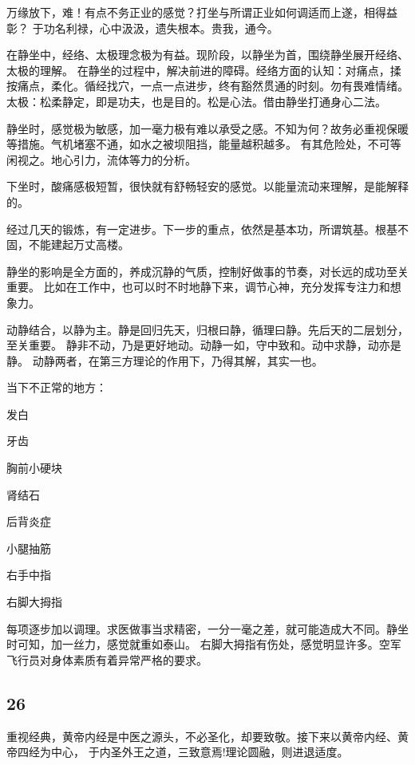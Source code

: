 万缘放下，难！有点不务正业的感觉？打坐与所谓正业如何调适而上遂，相得益彰？
于功名利禄，心中汲汲，遗失根本。贵我，通今。

在静坐中，经络、太极理念极为有益。现阶段，以静坐为首，围绕静坐展开经络、太极的理解。
在静坐的过程中，解决前进的障碍。经络方面的认知：对痛点，揉按痛点，柔化。循经找穴，一点一点进步，终有豁然贯通的时刻。勿有畏难情绪。
太极：松柔静定，即是功夫，也是目的。松是心法。借由静坐打通身心二法。

静坐时，感觉极为敏感，加一毫力极有难以承受之感。不知为何？故务必重视保暖等措施。气机堵塞不通，如水之被坝阻挡，能量越积越多。
有其危险处，不可等闲视之。地心引力，流体等力的分析。

下坐时，酸痛感极短暂，很快就有舒畅轻安的感觉。以能量流动来理解，是能解释的。

经过几天的锻炼，有一定进步。下一步的重点，依然是基本功，所谓筑基。根基不固，不能建起万丈高楼。

静坐的影响是全方面的，养成沉静的气质，控制好做事的节奏，对长远的成功至关重要。
比如在工作中，也可以时不时地静下来，调节心神，充分发挥专注力和想象力。

动静结合，以静为主。静是回归先天，归根曰静，循理曰静。先后天的二层划分，至关重要。
静非不动，乃是更好地动。动静一如，守中致和。动中求静，动亦是静。
动静两者，在第三方理论的作用下，乃得其解，其实一也。

当下不正常的地方：
\begin{enumbox}
\item 发白
\item 牙齿
\item 胸前小硬块
\item 肾结石
\item 后背炎症
\item 小腿抽筋
\item 右手中指
\item 右脚大拇指
\end{enumbox}

每项逐步加以调理。求医做事当求精密，一分一毫之差，就可能造成大不同。静坐时可知，加一丝力，感觉就重如泰山。
右脚大拇指有伤处，感觉明显许多。空军飞行员对身体素质有着异常严格的要求。

\subsection{26}

重视经典，黄帝内经是中医之源头，不必圣化，却要致敬。接下来以黄帝内经、黄帝四经为中心，
于内圣外王之道，三致意焉!理论圆融，则进退适度。

